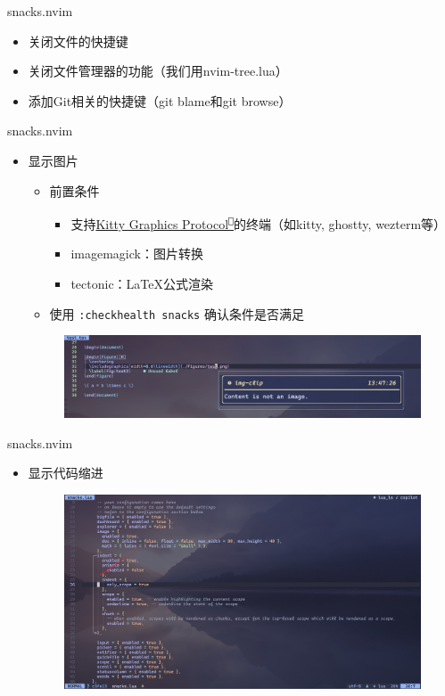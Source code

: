 \documentclass[aspectratio=169]{ctexbeamer}
\newcommand{\nerd}[1]{\texttt{#1}}
\newcommand{\link}[3][]{\href{#3}{#2\textsuperscript{\nerd{}}}}
\begin{document}
  \begin{frame}{snacks.nvim}
    \begin{itemize}
      \item 关闭文件的快捷键
      \item 关闭文件管理器的功能（我们用nvim-tree.lua）
      \item 添加Git相关的快捷键（git blame和git browse）
    \end{itemize}
  \end{frame}

  \begin{frame}{snacks.nvim}
    \begin{itemize}
      \item 显示图片
        \begin{itemize}
          \item 前置条件
            \begin{itemize}
              \item 支持\link{Kitty Graphics Protocol}{https://sw.kovidgoyal.net/kitty/graphics-protocol/}的终端（如kitty, ghostty, wezterm等）
              \item imagemagick：图片转换
              \item tectonic：LaTeX公式渲染
            \end{itemize}
          \item 使用 \lstinline[style=nvim]{:checkhealth snacks} 确认条件是否满足
        \end{itemize}
        \begin{figure}[H]
          \centering
          \includegraphics[width=0.9\linewidth]{./Figures/Snacks_Config_3_Image.jpg}
        \end{figure}
    \end{itemize}
  \end{frame}

  \begin{frame}{snacks.nvim}
    \begin{itemize}
      \item 显示代码缩进
        \begin{figure}[H]
          \centering
          \includegraphics[width=0.7\linewidth]{./Figures/Snacks_Config_4_Indent.jpg}
        \end{figure}
    \end{itemize}
  \end{frame}
\end{document}
